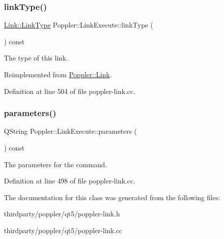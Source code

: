 \subsubsection{\texorpdfstring{link\+Type()}{linkType()}}
{\footnotesize\ttfamily \hyperlink{class_poppler_1_1_link_af0dacfa77a548bb043dbae4bb9dc6c1e}{Link\+::\+Link\+Type} Poppler\+::\+Link\+Execute\+::link\+Type (\begin{DoxyParamCaption}{ }\end{DoxyParamCaption}) const\hspace{0.3cm}{\ttfamily [virtual]}}

The type of this link. 

Reimplemented from \hyperlink{class_poppler_1_1_link_a3e3ad7e8867e255c24b9a562bad596ed}{Poppler\+::\+Link}.



Definition at line 504 of file poppler-\/link.\+cc.

\mbox{\label{class_poppler_1_1_link_execute_a1da68fd8e38290ab1a4d58a5358f3ecf}} 
\subsubsection{\texorpdfstring{parameters()}{parameters()}}
{\footnotesize\ttfamily Q\+String Poppler\+::\+Link\+Execute\+::parameters (\begin{DoxyParamCaption}{ }\end{DoxyParamCaption}) const}

The parameters for the command. 

Definition at line 498 of file poppler-\/link.\+cc.



The documentation for this class was generated from the following files\+:\begin{DoxyCompactItemize}
\item 
thirdparty/poppler/qt5/poppler-\/link.\+h\item 
thirdparty/poppler/qt5/poppler-\/link.\+cc\end{DoxyCompactItemize}

